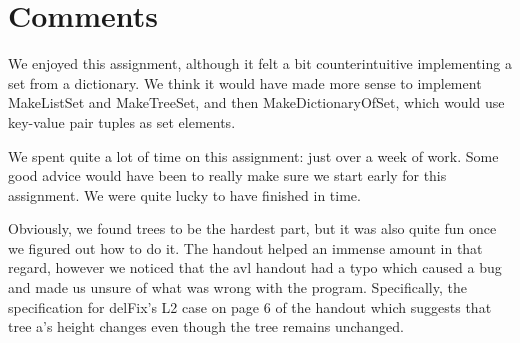 \section{Comments}
We enjoyed this assignment, although it felt a bit counterintuitive implementing a set from a dictionary. We think it would have made more sense to implement MakeListSet and MakeTreeSet, and then MakeDictionaryOfSet, which would use key-value pair tuples as set elements.

We spent quite a lot of time on this assignment: just over a week of work. Some good advice would have been to really make sure we start early for this assignment. We were quite lucky to have finished in time.

Obviously, we found trees to be the hardest part, but it was also quite fun once we figured out how to do it. The handout helped an immense amount in that regard, however we noticed that the avl handout had a typo which caused a bug and made us unsure of what was wrong with the program. Specifically, the specification for delFix's L2 case on page 6 of the handout which suggests that tree a's height changes even though the tree remains unchanged.


